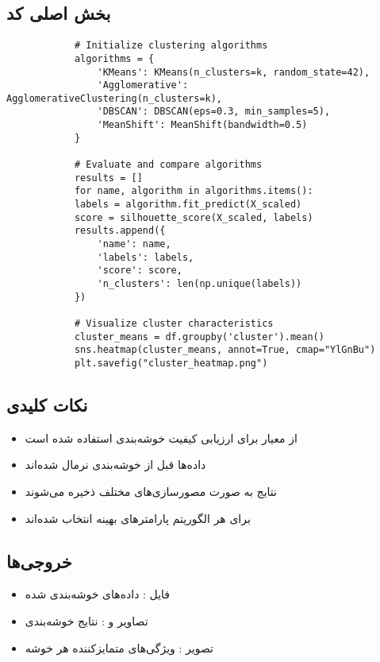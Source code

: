 \documentclass[a4paper,12pt]{article}
\begin{document}
	\subsection{بخش اصلی کد}
	\begin{latin}
		\begin{verbatim}
			# Initialize clustering algorithms
			algorithms = {
				'KMeans': KMeans(n_clusters=k, random_state=42),
				'Agglomerative': AgglomerativeClustering(n_clusters=k),
				'DBSCAN': DBSCAN(eps=0.3, min_samples=5),
				'MeanShift': MeanShift(bandwidth=0.5)
			}
			
			# Evaluate and compare algorithms
			results = []
			for name, algorithm in algorithms.items():
			labels = algorithm.fit_predict(X_scaled)
			score = silhouette_score(X_scaled, labels)
			results.append({
				'name': name,
				'labels': labels,
				'score': score,
				'n_clusters': len(np.unique(labels))
			})
			
			# Visualize cluster characteristics
			cluster_means = df.groupby('cluster').mean()
			sns.heatmap(cluster_means, annot=True, cmap="YlGnBu")
			plt.savefig("cluster_heatmap.png")
		\end{verbatim}
	\end{latin}
	
	\subsection{نکات کلیدی}
	\begin{itemize}
		\item از معیار  برای ارزیابی کیفیت خوشه‌بندی استفاده شده است
		\item داده‌ها قبل از خوشه‌بندی نرمال شده‌اند
		\item نتایج به صورت مصورسازی‌های مختلف ذخیره می‌شوند
		\item برای هر الگوریتم پارامترهای بهینه انتخاب شده‌اند
	\end{itemize}
	
	\subsection{خروجی‌ها}
	\begin{itemize}
		\item فایل : داده‌های خوشه‌بندی شده
		\item تصاویر  و : نتایج خوشه‌بندی
		\item تصویر : ویژگی‌های متمایزکننده هر خوشه
	\end{itemize}
	
\end{document}
